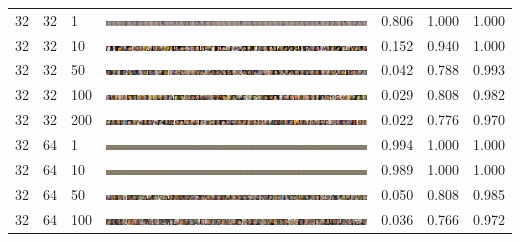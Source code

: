 \documentclass[a4paper]{article}
\begin{document}
\begin{table}[h!]
\begin{center}
{\begin{tabular}{lllcccc}
      \hline
      32 & 32 & 1   & \includegraphics[width=\textwidth,trim={1536px 0 0 0},clip]{figures/faces_g32_d32_ep1_generator.jpg}    & 0.806 & 1.000 & 1.000\\
      32 & 32 & 10  & \includegraphics[width=\textwidth,trim={1536px 0 0 0},clip]{figures/faces_g32_d32_ep10_generator.jpg}   & 0.152 & 0.940 & 1.000\\
      32 & 32 & 50  & \includegraphics[width=\textwidth,trim={1536px 0 0 0},clip]{figures/faces_g32_d32_ep50_generator.jpg}   & 0.042 & 0.788 & 0.993\\
      32 & 32 & 100 & \includegraphics[width=\textwidth,trim={1536px 0 0 0},clip]{figures/faces_g32_d32_ep100_generator.jpg}  & 0.029 & 0.808 & 0.982\\
      32 & 32 & 200 & \includegraphics[width=\textwidth,trim={1536px 0 0 0},clip]{figures/faces_g32_d32_ep200_generator.jpg}  & 0.022 & 0.776 & 0.970\\
      \hline
      32 & 64 & 1   & \includegraphics[width=\textwidth,trim={1536px 0 0 0},clip]{figures/faces_g32_d64_ep1_generator.jpg}    & 0.994 & 1.000 & 1.000\\
      32 & 64 & 10  & \includegraphics[width=\textwidth,trim={1536px 0 0 0},clip]{figures/faces_g32_d64_ep10_generator.jpg}   & 0.989 & 1.000 & 1.000\\
      32 & 64 & 50  & \includegraphics[width=\textwidth,trim={1536px 0 0 0},clip]{figures/faces_g32_d64_ep50_generator.jpg}   & 0.050 & 0.808 & 0.985\\
      32 & 64 & 100 & \includegraphics[width=\textwidth,trim={1536px 0 0 0},clip]{figures/faces_g32_d64_ep100_generator.jpg}  & 0.036 & 0.766 & 0.972\\

\end{tabular}}
\end{center}
\end{table}
\end{document}
